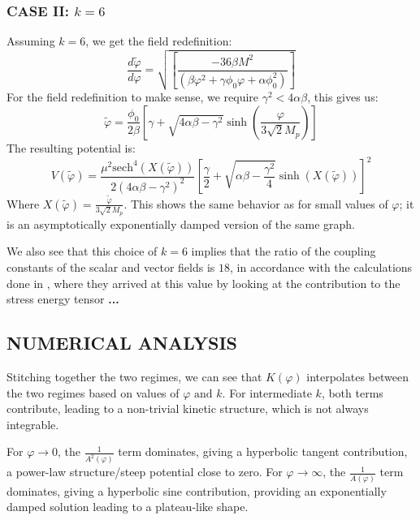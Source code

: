\documentclass[aps,prd,reprint,preprintnumbers,showpacs,floatfix,nofootinbib,superscript address]{revtex4-2}
\begin{document}
\subsubsection{\textbf{CASE II}: $k = 6$}
Assuming $k=6$,  we get the field redefinition:
\begin{equation}
    \frac{d\tilde{\varphi}}{d\varphi} = \sqrt{\left[\frac{-36 \beta M^2}{(\beta \varphi^2 + \gamma\phi_0\varphi + \alpha \phi_0^2)} \right]}
\end{equation}
For the field redefinition to make sense, we require $\gamma^2 < 4\alpha \beta$, this gives us:
\begin{equation}
    \tilde{\varphi} = \frac{\phi_0}{2\beta} \left[\gamma + \sqrt{4\alpha\beta - \gamma^2} \sinh\left(\frac{\varphi}{3\sqrt{2}M_p}\right) \right]
\end{equation}
The resulting potential is:
\begin{equation}
    V(\tilde{\varphi}) =  \frac{\mu^2\text{sech}^4\left(X(\tilde{\varphi}) \right)}{2(4\alpha\beta-\gamma^2)^2}  \left[\frac{\gamma }{2} + \sqrt{\alpha\beta-\frac{\gamma^2}{4}} \sinh\left( X(\tilde{\varphi})\right) \right]^2
\end{equation}
Where $X(\tilde{\varphi}) = \frac{\tilde{\varphi}}{3\sqrt{2}M_p}$. This shows the same behavior as \cite{barker2024poincaregaugetheoryconformal} for small values of $\varphi$; it is an asymptotically exponentially damped version of the same graph.

We also see that this choice of $k = 6$ implies that the ratio of the coupling constants of the scalar and vector fields is $18$, in accordance with the calculations done in \cite{doi:10.1098/rspa.1977.0151}, where they arrived at this value by looking at the contribution to the stress energy tensor \textbf{...}

\subsection{\textbf{NUMERICAL ANALYSIS}}
Stitching together the two regimes, we can see that $K(\varphi)$ interpolates between the two regimes based on values of $\varphi \, \, \text{and}\, \,k$. For intermediate $k$, both terms contribute, leading to a non-trivial kinetic structure, which is not always integrable.

For $\varphi \rightarrow 0$, the $\frac{1}{A^2(\varphi)}$ term dominates, giving a hyperbolic tangent contribution, a power-law structure/steep potential close to zero. For $\varphi \rightarrow \infty$, the $\frac{1}{A(\varphi)}$ term dominates,  giving a hyperbolic sine contribution, providing an exponentially damped solution leading to a plateau-like shape. 
\end{document}
